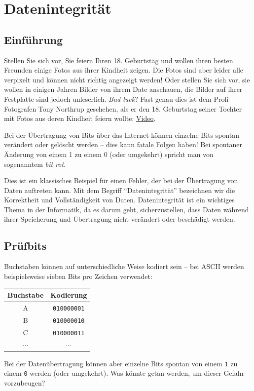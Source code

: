 \chapter{Datenintegrität}

\section{Einführung}

Stellen Sie sich vor, Sie feiern Ihren 18. Geburtstag und wollen ihren besten Freunden einige Fotos aus ihrer Kindheit zeigen. Die Fotos sind aber leider alle verpixelt und können nicht richtig angezeigt werden! Oder stellen Sie sich vor, sie wollen in einigen Jahren Bilder von ihrem Date anschauen, die Bilder auf ihrer Festplatte sind jedoch unleserlich. \textit{Bad luck}? Fast genau dies ist dem Profi-Fotografen Tony Northrup geschehen, als er den 18. Geburtstag seiner Tochter mit Fotos aus deren Kindheit feiern wollte: \href{https://www.youtube.com/watch?v=xvbnhCDfREk}{Video}.

Bei der Übertragung von Bits über das Internet können einzelne Bits spontan verändert oder gelöscht werden -- dies kann fatale Folgen haben! Bei spontaner Änderung von einem 1 zu einem 0 (oder umgekehrt) spricht man von sogenanntem \textit{bit rot}.

Dies ist ein klassisches Beispiel für einen Fehler, der bei der Übertragung von Daten auftreten kann. Mit dem Begriff ``Datenintegrität'' bezeichnen wir die Korrektheit und Vollständigkeit von Daten. Datenintegrität ist ein wichtiges Thema in der Informatik, da es darum geht, sicherzustellen, dass Daten während ihrer Speicherung und Übertragung nicht verändert oder beschädigt werden.

\section{Prüfbits}

Buchstaben können auf unterschiedliche Weise kodiert sein -- bei \gls{ASCII} werden beispielsweise sieben Bits pro Zeichen verwendet:

\begin{table}[H]
    \centering
    \begin{tabular}{c|c}
        Buchstabe & Kodierung          \\\midrule\midrule
        A         & \texttt{010000001} \\\midrule
        B         & \texttt{010000010} \\\midrule
        C         & \texttt{010000011} \\\midrule
        $\cdots$  & $\cdots$
    \end{tabular}
\end{table}
Bei der Datenübertragung können aber einzelne Bits spontan von einem \texttt{1} zu einem \texttt{0} werden (oder umgekehrt). Was könnte getan werden, um dieser Gefahr vorzubeugen?

